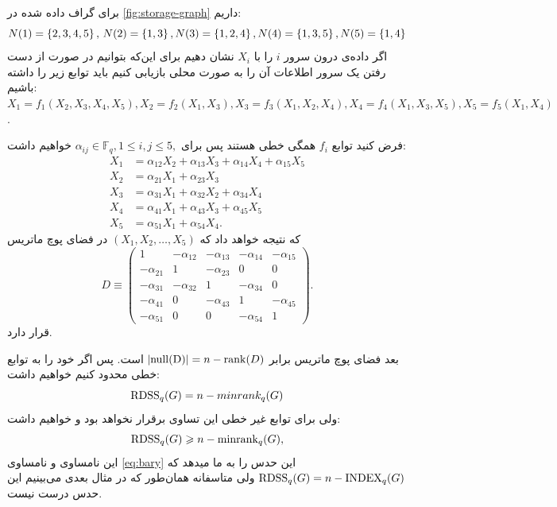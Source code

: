  \begin{example}
 	برای گراف داده شده در
 	\autoref{fig:storage-graph}
 	داریم:
 	$$
 		N(1) = \left\{ 2,3,4,5 \right\}, \, N(2)  = \left\{ 1,3 \right\}, N(3)  = \left\{ 1,2,4 \right\}, N(4)  = \left\{ 1,3,5 \right\},  N(5)  = \left\{ 1,4 \right\}
 	$$
 	اگر داده‌ی درون سرور
 	$i$
 	را با
 	$X_i$
 	نشان دهیم برای این‌که بتوانیم در صورت از دست رفتن یک سرور اطلاعات آن را به صورت محلی بازیابی کنیم باید توابع زیر را داشته باشیم: 	
 	$X_1 = f_1(X_2,X_3,X_4,X_5), X_2 = f_2(X_1,X_3), X_3 = f_3(X_1,X_2,X_4), X_4 = f_4(X_1,X_3, X_5), X_5 = f_5(X_1, X_4)$.

 	فرض کنید توابع
 	$f_i$
 	همگی خطی هستند پس برای
 	$\alpha_{ij} \in  \mathbb{F}_q, 1\le i,j\le 5,$
 	خواهیم داشت:
 	 	\begin{align*}
 		X_1 &= \alpha_{12} X_2 +\alpha_{13} X_3 + \alpha_{14}X_4 + \alpha_{15}X_5\\
 		X_2 &= \alpha_{21}X_1+\alpha_{23}X_3\\
 		X_3 &= \alpha_{31}X_1 +\alpha_{32}X_2+\alpha_{34}X_4\\
 		X_4 &= \alpha_{41}X_1 + \alpha_{43}X_3 + \alpha_{45}X_5\\
 		X_5 &= \alpha_{51}X_1+\alpha_{54}X_4.
 	\end{align*}
 	که نتیجه خواهد داد که
 	$(X_1,X_2,\dots, X_5)$
 	در فضای پوچ ماتریس
 	\[
 	D \equiv
 	\left( \begin{array}{ccccc}
 		1 & -\alpha_{12} & -\alpha_{13}  & - \alpha_{14} & -\alpha_{15} \\
 		-\alpha_{21} & 1 &  -\alpha_{23} & 0 & 0 \\
 		-\alpha_{31} & -\alpha_{32} & 1 & -\alpha_{34} & 0\\
 		-\alpha_{41} & 0 &-\alpha_{43}  & 1 & -\alpha_{45}\\
 		-\alpha_{51} &0 & 0 & -\alpha_{54} & 1
 	\end{array} \right).\] 
 	قرار دارد.
 	
 	بعد فضای پوچ ماتریس برابر
 	$\left|{\rm{null}(D)}\right| = n - \operatorname{rank}(D)$
 	است. پس اگر خود را به توابع خطی محدود کنیم خواهیم داشت:
 	$$\mathrm{RDSS}_q(G) = n - minrank_q(G)$$
 	ولی برای توابع غیر خطی این تساوی برقرار نخواهد بود و خواهیم داشت:
 	\begin{equation}
 		\mathrm{RDSS}_q(G) \geqslant n - \mathrm{minrank}_q(G),
 		\label{eq:minrk}
 	\end{equation}
 	این نامساوی و نامساوی
 	\autoref{eq:bary}
 	این حدس را به ما میدهد که
 	$\mathrm{RDSS}_q(G) = n - \mathrm{INDEX}_q(G)$
 	ولی متاسفانه همان‌طور که در مثال بعدی می‌بینیم این حدس درست نیست.
 \end{example}
 
